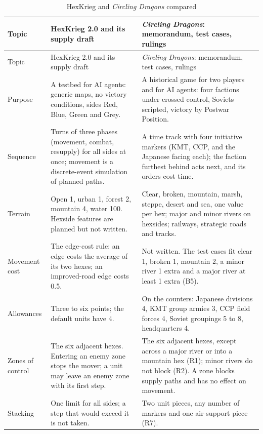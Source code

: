 \documentclass[11pt]{article}
\begin{document}
{\small
\begin{longtable}{@{}>{\raggedright\arraybackslash}p{}>{\raggedright\arraybackslash}p{}>{\raggedright\arraybackslash}p{}@{}}
\caption{HexKrieg and \emph{Circling Dragons} compared}\label{tab:compare}\\
\toprule
Topic & HexKrieg 2.0 and its supply draft & \emph{Circling Dragons}: memorandum, test cases, rulings \\
\midrule
\endfirsthead
\toprule
Topic & HexKrieg 2.0 and its supply draft & \emph{Circling Dragons}: memorandum, test cases, rulings \\
\midrule
\endhead
\bottomrule
\endfoot
Purpose & A testbed for AI agents: generic maps, no victory conditions, sides Red, Blue, Green and Grey. & A historical game for two players and for AI agents: four factions under crossed control, Soviets scripted, victory by Postwar Position. \\
Sequence & Turns of three phases (movement, combat, resupply) for all sides at once; movement is a discrete-event simulation of planned paths. & A time track with four initiative markers (KMT, CCP, and the Japanese facing each); the faction furthest behind acts next, and its orders cost time. \\
Terrain & Open 1, urban 1, forest 2, mountain 4, water 100. Hexside features are planned but not written. & Clear, broken, mountain, marsh, steppe, desert and sea, one value per hex; major and minor rivers on hexsides; railways, strategic roads and tracks. \\
Movement cost & The edge-cost rule: an edge costs the average of its two hexes; an improved-road edge costs 0.5. & Not written. The test cases fit clear 1, broken 1, mountain 2, a minor river 1 extra and a major river at least 1 extra (B5). \\
Allowances & Three to six points; the default units have 4. & On the counters: Japanese divisions 4, KMT group armies 3, CCP field forces 4, Soviet groupings 5 to 8, headquarters 4. \\
Zones of control & The six adjacent hexes. Entering an enemy zone stops the mover; a unit may leave an enemy zone with its first step. & The six adjacent hexes, except across a major river or into a mountain hex (R1); minor rivers do not block (R2). A zone blocks supply paths and has no effect on movement. \\
Stacking & One limit for all sides; a step that would exceed it is not taken. & Two unit pieces, any number of markers and one air-support piece (R7). \\

\end{longtable}}
\end{document}
